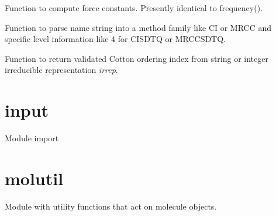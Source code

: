 \documentclass[letterpaper,10pt,english]{sphinxmanual}
\begin{document}

\begin{fulllineitems}
\label{index:driver.hessian}
Function to compute force constants. Presently identical to frequency().

\end{fulllineitems}


\begin{fulllineitems}
\label{index:driver.parse_arbitrary_order}
Function to parse name string into a method family like CI or MRCC and specific
level information like 4 for CISDTQ or MRCCSDTQ.

\end{fulllineitems}


\begin{fulllineitems}
\label{index:driver.parse_cotton_irreps}
Function to return validated Cotton ordering index from string or integer
irreducible representation \emph{irrep}.

\end{fulllineitems}



\section{input}
\label{index:input}\label{index:module-input}
Module import

\begin{fulllineitems}
\label{index:input.process_input}
\end{fulllineitems}



\section{molutil}
\label{index:module-molutil}\label{index:molutil}
Module with utility functions that act on molecule objects.
\end{document}
